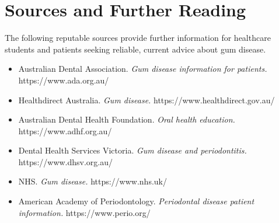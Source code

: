 \section*{Sources and Further Reading}
The following reputable sources provide further information for healthcare students and patients seeking reliable, current advice about gum disease.

\begin{itemize}
    \item Australian Dental Association. \textit{Gum disease information for patients.} https://www.ada.org.au/
    \item Healthdirect Australia. \textit{Gum disease.} https://www.healthdirect.gov.au/
    \item Australian Dental Health Foundation. \textit{Oral health education.} https://www.adhf.org.au/
    \item Dental Health Services Victoria. \textit{Gum disease and periodontitis.} https://www.dhsv.org.au/
    \item NHS. \textit{Gum disease.} https://www.nhs.uk/
    \item American Academy of Periodontology. \textit{Periodontal disease patient information.} https://www.perio.org/
\end{itemize}
